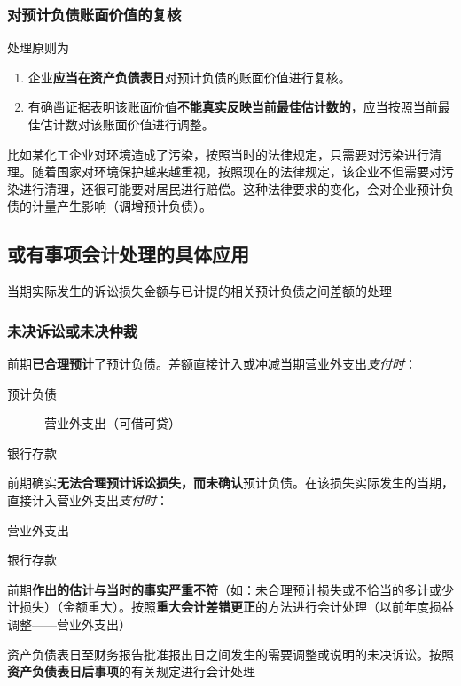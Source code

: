 \documentclass[UTF8,12pt]{ctexart}
\newenvironment{Dr}{%
	\begin{list}{}%
		{
			\setlength{\leftmargin}{2em}
			\setlength{\labelwidth}{2em}
			\setlength{\labelsep}{0pt}
			\setlength{\itemindent}{0pt}
			\setlength{\listparindent}{0pt}
			\setlength{\parsep}{0pt}
			\setlength{\topsep}{0pt}
		}
		\item[\textbf{借：}]
	}{%
	\end{list}
}
\newenvironment{Cr}{%
	\begin{list}{}%
		{
			\setlength{\leftmargin}{2em}
			\setlength{\labelwidth}{2em}
			\setlength{\labelsep}{0pt}
			\setlength{\itemindent}{0pt}
			\setlength{\listparindent}{0pt}
			\setlength{\parsep}{0pt}
			\setlength{\topsep}{0pt}
		}
		\item[\textbf{贷：}]
	}{%
	\end{list}
}
\numberwithin{equation}{section} %
\numberwithin{figure}{section}
\numberwithin{table}{section}
\begin{document}
	
	\subsubsection{对预计负债账面价值的复核}
	处理原则为
	\begin{enumerate}
		\item 企业\textbf{应当在资产负债表日}对预计负债的账面价值进行复核。
		
		\item 有确凿证据表明该账面价值\textbf{不能真实反映当前最佳估计数的}，应当按照当前最佳估计数对该账面价值进行调整。
	\end{enumerate}
	
	比如某化工企业对环境造成了污染，按照当时的法律规定，只需要对污染进行清理。随着国家对环境保护越来越重视，按照现在的法律规定，该企业不但需要对污染进行清理，还很可能要对居民进行赔偿。这种法律要求的变化，会对企业预计负债的计量产生影响（调增预计负债）。
	
	\subsection{或有事项会计处理的具体应用}
	当期实际发生的诉讼损失金额与已计提的相关预计负债之间差额的处理
	
	\subsubsection{未决诉讼或未决仲裁}
	\begin{enumerate}
		\item 前期\textbf{已合理预计}了预计负债。差额直接计入或冲减当期营业外支出\textit{支付时}：
		
		\begin{Dr}
			预计负债
			
			\ \ \ \ \ \ 营业外支出（可借可贷） 
		\end{Dr}
		\begin{Cr}
			银行存款
		\end{Cr}
		
		\item 前期确实\textbf{无法合理预计诉讼损失，而未确认}预计负债。在该损失实际发生的当期，直接计入营业外支出\textit{支付时}：
		
		\begin{Dr}
			营业外支出
		\end{Dr}
		\begin{Cr}
			银行存款
		\end{Cr}
		
		
		\item 前期\textbf{作出的估计与当时的事实严重不符}（如：未合理预计损失或不恰当的多计或少计损失）（金额重大）。按照\textbf{重大会计差错更正}的方法进行会计处理（以前年度损益调整——营业外支出）
		
		
		\item 资产负债表日至财务报告批准报出日之间发生的需要调整或说明的未决诉讼。按照\textbf{资产负债表日后事项}的有关规定进行会计处理
	\end{enumerate}
\end{document}
